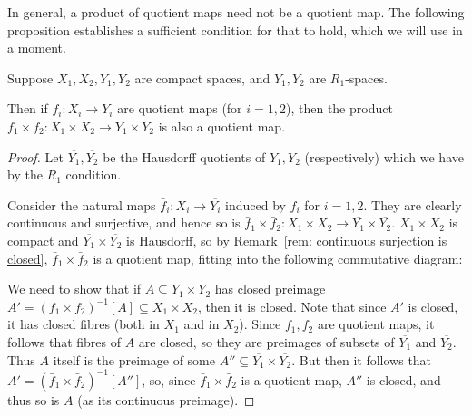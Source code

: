 	
	In general, a product of quotient maps need not be a quotient map. The following proposition establishes a sufficient condition for that to hold, which we will use in a moment.
	\begin{prop}
		\label{prop:product_quotient}
		Suppose $X_1,X_2, Y_1,Y_2$ are compact spaces, and $Y_1,Y_2$ are $R_1$-spaces.
		
		Then if $f_i\colon X_i\to Y_i$ are quotient maps (for $i=1,2$), then the product $f_1\times f_2\colon X_1\times X_2\to Y_1\times Y_2$ is also a quotient map.
	\end{prop}
	\begin{proof}
		Let $\overline{Y_1},\overline{Y_2}$ be the Hausdorff quotients of $Y_1,Y_2$ (respectively) which we have by the $R_1$ condition.
		
		Consider the natural maps $\bar f_i\colon X_i\to \overline{Y_i}$ induced by $f_i$ for $i=1,2$. They are clearly continuous and surjective, and hence so is $\bar f_1\times \bar f_2\colon X_1\times X_2\to \overline{Y_1}\times \overline{Y_2}$. $X_1\times X_2$ is compact and $\overline{Y_1}\times \overline{Y_2}$ is Hausdorff, so by Remark~\ref{rem: continuous surjection is closed}, $\bar f_1\times \bar f_2$ is a quotient map, fitting into the following commutative diagram:
		\begin{center}
		\end{center}
		We need to show that if $A\subseteq Y_1\times Y_2$ has closed preimage $A'=(f_1\times f_2)^{-1}[A]\subseteq X_1\times X_2$, then it is closed. Note that since $A'$ is closed, it has closed fibres (both in $X_1$ and in $X_2$). Since $f_1,f_2$ are quotient maps, it follows that fibres of $A$ are closed, so they are preimages of subsets of $\overline{Y_1}$ and $\overline{Y_2}$. Thus $A$ itself is the preimage of some $A''\subseteq \overline{Y_1}\times \overline{Y_2}$. But then it follows that $A'=(\bar f_1\times \bar f_2)^{-1}[A'']$, so, since $\bar f_1\times \bar f_2$ is a quotient map, $A''$ is closed, and thus so is $A$ (as its continuous preimage).
	\end{proof}
	
